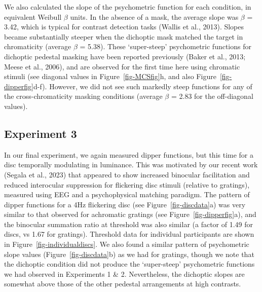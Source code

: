 \documentclass[
  letterpaper,
  DIV=11,
  numbers=noendperiod]{scrartcl}
\begin{document}
We also calculated the slope of the psychometric function for each
condition, in equivalent Weibull \(\beta\) units. In the absence of a
mask, the average slope was \(\beta\) = 3.42, which is typical for
contrast detection tasks (Wallis et al., 2013). Slopes became
substantially steeper when the dichoptic mask matched the target in
chromaticity (average \(\beta\) = 5.38). These `super-steep'
psychometric functions for dichoptic pedestal masking have been reported
previously (Baker et al., 2013; Meese et al., 2006), and are observed
for the first time here using chromatic stimuli (see diagonal values in
Figure~\ref{fig-MCSfig}h, and also Figure~\ref{fig-dipperfig}d-f).
However, we did not see such markedly steep functions for any of the
cross-chromaticity masking conditions (average \(\beta\) = 2.83 for the
off-diagonal values).

\hypertarget{experiment-3}{%
\subsection{Experiment 3}\label{experiment-3}}

In our final experiment, we again measured dipper functions, but this
time for a disc temporally modulating in luminance. This was motivated
by our recent work (Segala et al., 2023) that appeared to show increased
binocular facilitation and reduced interocular suppression for
flickering disc stimuli (relative to gratings), measured using EEG and a
psychophysical matching paradigm. The pattern of dipper functions for a
4Hz flickering disc (see Figure~\ref{fig-discdata}a) was very similar to
that observed for achromatic gratings (see Figure~\ref{fig-dipperfig}a),
and the binocular summation ratio at threshold was also similar (a
factor of 1.49 for discs, vs 1.67 for gratings). Threshold data for
individual participants are shown in Figure~\ref{fig-individualdiscs}.
We also found a similar pattern of psychometric slope values
(Figure~\ref{fig-discdata}b) as we had for gratings, though we note that
the dichoptic condition did not produce the `super-steep' psychometric
functions we had observed in Experiments 1 \& 2. Nevertheless, the
dichoptic slopes are somewhat above those of the other pedestal
arrangements at high contrasts.
\end{document}
